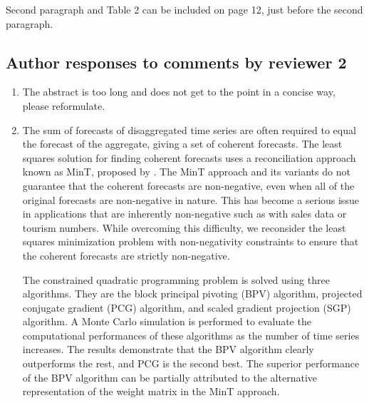 \documentclass[10pt,a4paper]{article}
\begin{document}
\begin{enumerate}
{	{\color{red} Second paragraph and Table 2 can be included on page 12, just before the second paragraph.}
	}
\end{enumerate}
\clearpage
\newpage

\subsection*{Author responses to comments by reviewer 2}

\begin{enumerate}
\item The abstract is too long and does not get to the point in a concise way, please reformulate.
\item []{\color{blue}
	The sum of forecasts of disaggregated time series are often required to equal the forecast of the aggregate, giving a set of coherent forecasts. The least squares solution for finding coherent forecasts uses a reconciliation approach known as MinT, proposed by \citet{Wick2018}. The MinT approach and its variants do not guarantee that the coherent forecasts are non-negative, even when all of the original forecasts are non-negative in nature. This has become a serious issue in applications that are inherently non-negative such as with sales data or tourism numbers. While overcoming this difficulty, we reconsider the least squares minimization problem with non-negativity constraints to ensure that the coherent forecasts are strictly non-negative.
	
	The constrained quadratic programming problem is solved using three algorithms. They are the block principal pivoting (BPV) algorithm, projected conjugate gradient (PCG) algorithm, and scaled gradient projection (SGP) algorithm. A Monte Carlo simulation is performed to evaluate the computational performances of these algorithms as the number of time series increases. The results demonstrate that the BPV algorithm clearly outperforms the rest, and PCG is the second best. The superior performance of the BPV algorithm can be partially attributed to the alternative representation of the weight matrix in the MinT approach.
	
}
\end{enumerate}
\end{document}
